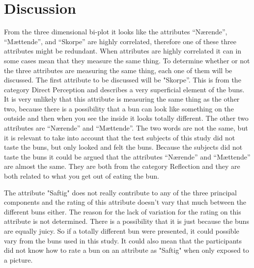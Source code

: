 \section*{Discussion}
\label{discussion}
%
From the three dimensional bi-plot it looks like the attributes “Nærende”, “Mættende”, and “Skorpe” are highly correlated, therefore one of these three attributes might be redundant. 
When attributes are highly correlated it can in some cases mean that they measure the same thing. To determine whether or not the three attributes are measuring the same thing, each one of them will be discussed. \blankline
%
The first attribute to be discussed will be "Skorpe''. This is from the category Direct Perception and describes a very superficial element of the buns. It is very unlikely that this attribute is measuring the same thing as the other two, because there is a possibility that a bun can look like something on the outside and then when you see the inside it looks totally different. \blankline
%
The other two attributes are “Nærende” and “Mættende”. The two words are not the same, but it is relevant to take into account that the test subjects of this study did not taste the buns, but only looked and felt the buns. Because the subjects did not taste the buns it could be argued that the attributes “Nærende” and “Mættende” are almost the same. They are both from the category Reflection and they are both related to what you get out of eating the bun. \blankline

The attribute "Saftig" does not really contribute to any of the three principal components and the rating of this attribute doesn't vary that much between the different buns either. The reason for the lack of variation for the rating on this attribute is not determined. There is a possibility that it is just because the buns are equally juicy. So if a totally different bun were presented, it could possible vary from the buns used in this study. It could also mean that the participants did not know how to rate a bun on an attribute as "Saftig" when only exposed to a picture.